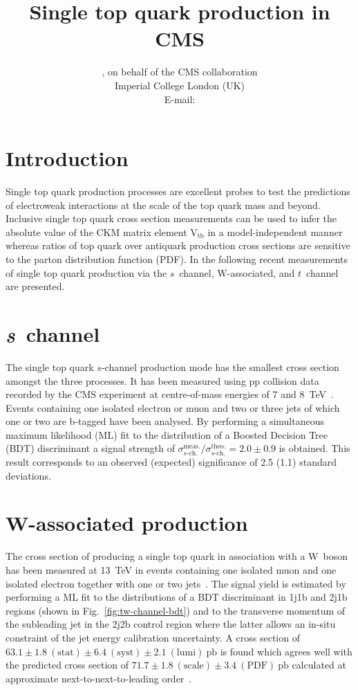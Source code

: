 \documentclass{PoS}
\title{Single top quark production in CMS}
\author{
    \speaker{Matthias Komm}, on behalf of the CMS collaboration\\
    Imperial College London (UK)\\
    E-mail: \email{Matthias.Komm@cern.ch}
}
\begin{document}
\section{Introduction}
Single top quark production processes are excellent probes to test the predictions of electroweak interactions at the scale of the top quark mass and beyond. Inclusive single top quark cross section measurements can be used to infer the absolute value of the CKM matrix element $\mathrm{V}_\mathrm{tb}$ in a model-independent manner whereas  ratios of top quark over antiquark production cross sections are sensitive to the parton distribution function (PDF). In the following recent measurements of single top quark production via the $s$~channel, W-associated, and $t$~channel are presented.

\section{\textit{s}~channel}

The single top quark $s$-channel production mode has the smallest cross section amongst the three processes. It has been measured using pp collision data recorded by the CMS experiment at centre-of-mass energies of 7 and 8~TeV~\cite{sch}. Events containing one isolated electron or muon and two or three jets of which one or two are b-tagged have been analysed. By performing a simultaneous maximum likelihood (ML) fit to the distribution of a Boosted Decision Tree (BDT) discriminant a signal strength of $\sigma^\mathrm{meas.}_{s\mbox{-}\mathrm{ch.}}/\sigma^\mathrm{theo.}_{s\mbox{-}\mathrm{ch.}}=2.0\pm0.9$ is obtained. This result corresponds to an observed (expected) significance of 2.5 (1.1) standard deviations.


\section{W-associated production}

The cross section of producing a single top quark in association with a W~boson has been measured at 13~TeV in events containing one isolated muon and one isolated electron together with one or two jets~\cite{tWch}. The signal yield is estimated by performing a ML fit to the distributions of a BDT discriminant in 1j1b and 2j1b regions (shown in Fig.~\ref{fig:tw-channel-bdt}) and to the transverse momentum of the subleading jet in the 2j2b control region where the latter allows an in-situ constraint of the jet energy calibration uncertainty. A cross section of $63.1\pm1.8~\mathrm{(stat)}\pm6.4~\mathrm{(syst)}\pm2.1~\mathrm{(lumi)}~\mathrm{pb}$ is found which agrees well with the predicted cross section of $71.7\pm1.8~\mathrm{(scale)}\pm3.4~\mathrm{(PDF)}~\mathrm{pb}$ calculated at approximate next-to-next-to-leading order~\cite{tw-xsec}.
\end{document}
